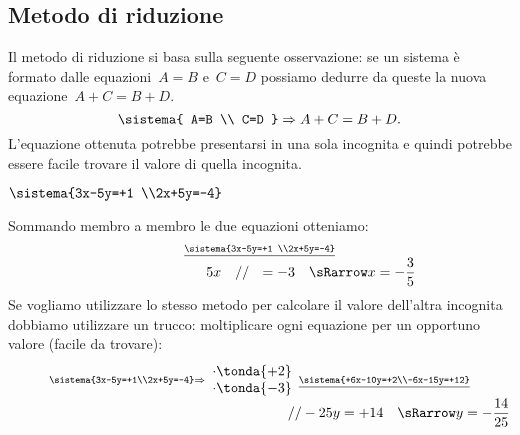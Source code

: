 \subsection{Metodo di riduzione}
Il metodo di riduzione si basa sulla seguente osservazione: se un
sistema è formato dalle equazioni~\(A=B\) e~\(C=D\) possiamo dedurre
da queste la nuova equazione~\(A+C=B+D\).
\begin{equation*}
\sistema{
A=B \\
C=D
}\Rightarrow A+C=B+D.
\end{equation*}
L'equazione ottenuta potrebbe presentarsi in una sola
incognita e quindi potrebbe essere facile trovare il valore di quella
incognita.

 \begin{esempio}
\(\sistema{3x-5y=+1 \\2x+5y=-4}\)

Sommando membro a membro le due equazioni otteniamo:
\[\stackrel{\underline{\sistema{3x-5y=+1 \\2x+5y=-4}}}
  {\qquad \qquad \qquad ~~~~5x ~~~ // ~~ =-3 \quad \sRarrow x=-\frac{3}{5}}\]
Se vogliamo utilizzare lo stesso metodo per calcolare il valore dell'altra 
incognita dobbiamo utilizzare un trucco: moltiplicare ogni equazione per un 
opportuno valore (facile da trovare):
\[\stackrel{\sistema{3x-5y=+1\\2x+5y=-4}\Rightarrow
  \begin{array}{l}\cdot \tonda{+2}\\ \cdot \tonda{-3}\end{array}
  \underline{\sistema{+6x-10y=+2\\-6x-15y=+12}}}
  {\qquad \qquad \qquad \qquad \qquad \qquad \qquad \qquad \qquad \qquad 
   //  -25y  =+14 \quad \sRarrow y=-\frac{14}{25}}\]
 \end{esempio}

